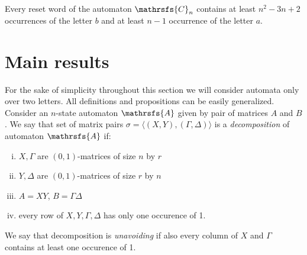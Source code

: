 \documentclass[11pt]{llncs}
\newcommand{\A}{\mathrsfs{A}}
\newcommand{\G}{\Gamma}
\newcommand{\D}{\Delta}
\begin{document}
\begin{proposition}
\label{th:cerny} Every reset word of the automaton $\mathrsfs{C}_n$ contains at
least $n^2 - 3n + 2$ occurrences of the letter $b$ and at least $n - 1$
occurrence of the letter $a$.
\end{proposition}
%
%

\section{Main results}
For the sake of simplicity throughout this section we will consider automata only
over two letters. All definitions and propositions can be easily generalized.
Consider an $n$-state automaton $\A$ given by pair of matrices $A$ and $B$.
We say that set of matrix pairs $\sigma = \langle(X,Y), (\G,\D)\rangle$ is
a \emph{decomposition} of automaton $\A$ if:
\begin{enumerate}[(i)]
\item $X, \G$ are $(0,1)$-matrices of size $n$ by $r$
\item $Y, \D$ are $(0,1)$-matrices of size $r$ by $n$
\item $A = XY$, $B = \G\D$
\item every row of $X,Y,\G,\D$ has only one occurence of 1.
\end{enumerate}
We say that decomposition is \emph{unavoiding} if also every column of $X$ and 
$\G$ contains at least one occurence of 1.
\end{document}
